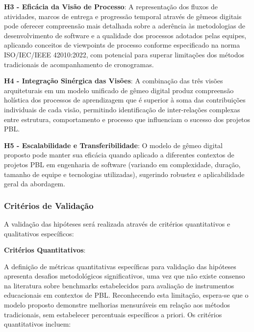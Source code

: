 \documentclass[12pt, a4paper, oneside]{abntex2}
\begin{document}
\textbf{H3 - Eficácia da Visão de Processo}: A representação dos fluxos de atividades, marcos de entrega e progressão temporal através de gêmeos digitais pode oferecer compreensão mais detalhada sobre a aderência às metodologias de desenvolvimento de software e a qualidade dos processos adotados pelas equipes, aplicando conceitos de viewpoints de processo conforme especificado na norma ISO/IEC/IEEE 42010:2022, com potencial para superar limitações dos métodos tradicionais de acompanhamento de cronogramas.

\textbf{H4 - Integração Sinérgica das Visões}: A combinação das três visões arquiteturais em um modelo unificado de gêmeo digital produz compreensão holística dos processos de aprendizagem que é superior à soma das contribuições individuais de cada visão, permitindo identificação de inter-relações complexas entre estrutura, comportamento e processo que influenciam o sucesso dos projetos PBL.

\textbf{H5 - Escalabilidade e Transferibilidade}: O modelo de gêmeo digital proposto pode manter sua eficácia quando aplicado a diferentes contextos de projetos PBL em engenharia de software (variando em complexidade, duração, tamanho de equipe e tecnologias utilizadas), sugerindo robustez e aplicabilidade geral da abordagem.

\subsubsection{Critérios de Validação}

A validação das hipóteses será realizada através de critérios quantitativos e qualitativos específicos:

\textbf{Critérios Quantitativos}:

A definição de métricas quantitativas específicas para validação das hipóteses apresenta desafios metodológicos significativos, uma vez que não existe consenso na literatura sobre benchmarks estabelecidos para avaliação de instrumentos educacionais em contextos de PBL. Reconhecendo esta limitação, espera-se que o modelo proposto demonstre melhorias mensuráveis em relação aos métodos tradicionais, sem estabelecer percentuais específicos a priori. Os critérios quantitativos incluem:
\end{document}
